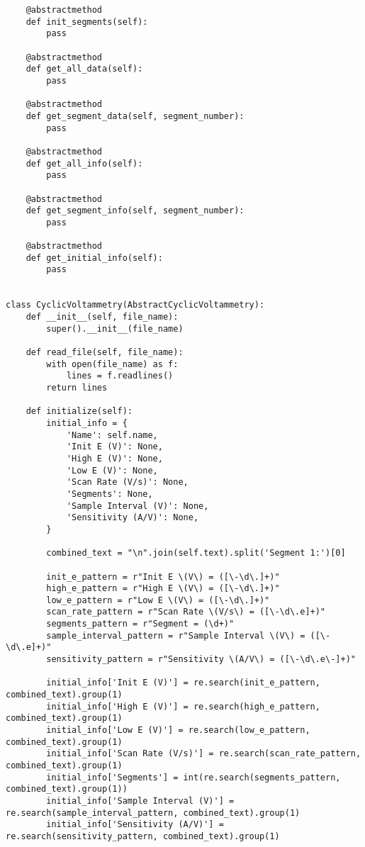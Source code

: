 \begin{verbatim}
    @abstractmethod
    def init_segments(self):
        pass
    
    @abstractmethod
    def get_all_data(self):
        pass

    @abstractmethod
    def get_segment_data(self, segment_number):
        pass

    @abstractmethod
    def get_all_info(self):
        pass

    @abstractmethod
    def get_segment_info(self, segment_number):
        pass
        
    @abstractmethod
    def get_initial_info(self):
        pass


class CyclicVoltammetry(AbstractCyclicVoltammetry):
    def __init__(self, file_name):
        super().__init__(file_name)

    def read_file(self, file_name):
        with open(file_name) as f:
            lines = f.readlines()
        return lines
    
    def initialize(self):
        initial_info = {
            'Name': self.name,
            'Init E (V)': None,
            'High E (V)': None,
            'Low E (V)': None,
            'Scan Rate (V/s)': None,
            'Segments': None,
            'Sample Interval (V)': None,
            'Sensitivity (A/V)': None,
        }

        combined_text = "\n".join(self.text).split('Segment 1:')[0]

        init_e_pattern = r"Init E \(V\) = ([\-\d\.]+)"
        high_e_pattern = r"High E \(V\) = ([\-\d\.]+)"
        low_e_pattern = r"Low E \(V\) = ([\-\d\.]+)"
        scan_rate_pattern = r"Scan Rate \(V/s\) = ([\-\d\.e]+)"
        segments_pattern = r"Segment = (\d+)"
        sample_interval_pattern = r"Sample Interval \(V\) = ([\-\d\.e]+)"
        sensitivity_pattern = r"Sensitivity \(A/V\) = ([\-\d\.e\-]+)"

        initial_info['Init E (V)'] = re.search(init_e_pattern, combined_text).group(1)
        initial_info['High E (V)'] = re.search(high_e_pattern, combined_text).group(1)
        initial_info['Low E (V)'] = re.search(low_e_pattern, combined_text).group(1)
        initial_info['Scan Rate (V/s)'] = re.search(scan_rate_pattern, combined_text).group(1)
        initial_info['Segments'] = int(re.search(segments_pattern, combined_text).group(1))
        initial_info['Sample Interval (V)'] = re.search(sample_interval_pattern, combined_text).group(1)
        initial_info['Sensitivity (A/V)'] = re.search(sensitivity_pattern, combined_text).group(1)


\end{verbatim}
